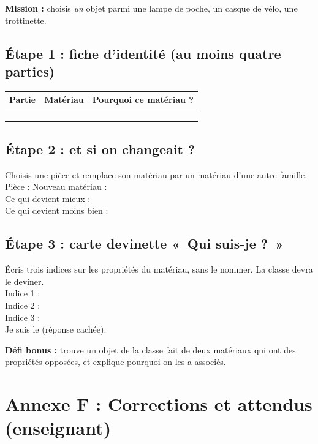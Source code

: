 \documentclass[11pt,a4paper]{article}
\begin{document}
\textbf{Mission :} choisis \emph{un} objet parmi une lampe de poche, un casque de vélo, une trottinette.

\subsection*{Étape 1 : fiche d'identité (au moins quatre parties)}
\begin{tabularx}{\linewidth}{>{\bfseries}p{3.2cm}Y Y}
\toprule
Partie & Matériau & Pourquoi ce matériau ?\\
\midrule
 & & \\ & & \\ & & \\ & & \\
\bottomrule
\end{tabularx}

\subsection*{Étape 2 : et si on changeait ?}
Choisis une pièce et remplace son matériau par un matériau d'une autre famille.\\
Pièce : \dotfill{} \quad Nouveau matériau : \dotfill\\
Ce qui devient mieux : \dotfill\\
Ce qui devient moins bien : \dotfill

\subsection*{Étape 3 : carte devinette «~Qui suis-je ?~»}
Écris trois indices sur les propriétés du matériau, sans le nommer. La classe devra le deviner.\\
Indice 1 : \dotfill\\
Indice 2 : \dotfill\\
Indice 3 : \dotfill\\
Je suis le \dotfill{} (réponse cachée).

\textbf{Défi bonus :} trouve un objet de la classe fait de deux matériaux qui ont des propriétés opposées, et explique pourquoi on les a associés.

\newpage
\section*{Annexe F : Corrections et attendus (enseignant)}
\end{document}
